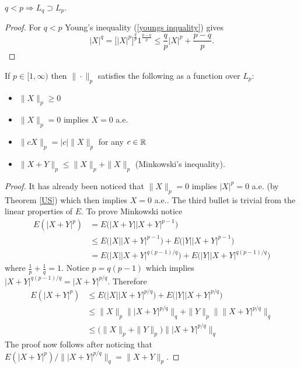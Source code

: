 \begin{theorem} $q<p \Longrightarrow L_q \supset L_p$.
\end{theorem}
\begin{proof} 
For $q<p$
Young's inequality (\ref{youngs inquality}) gives
\begin{equation}
\label{p bounds q} 
|X|^q = \bigl[|X|^p\bigr]^{\frac{q}{p}} 1^{\frac{p-q}{p}} \leq \frac{q}{p}|X|^p + \frac{p-q}{p}. 
\end{equation}
\end{proof}



\begin{theorem}
\label{pnorm is a pseudo-norm}
If $p\in [1,\infty)$ then
$\|\cdot \|_p$ satisfies the following as a function over $L_p$:
\begin{itemize}
\item $\| X \|_p \geq 0$ 
\item $\| X \|_p = 0$ implies $X = 0$ a.e.
\item $\| c X \|_p = |c| \| X \|_p$ for any $c\in \Bbb R$
\item $\| X + Y \|_p \leq \| X \|_p + \| X \|_p$ (Minkowski's inequality).
\end{itemize}
\end{theorem}
\begin{proof}
It has already been noticed that $\| X\|_p=0$ implies $|X|^p=0$ a.e. (by Theorem \ref{US}) which then implies $X=0$ a.e.. The third bullet is trivial from the linear properties of $E$. To prove Minkowski notice
\begin{align*}
E(|X+Y|^p)
& = E\bigl(|X+Y| |X+Y|^{p-1}\bigr) \\
& \leq E\bigl(|X| |X+Y|^{p-1}\bigr) + E\bigl(|Y| |X+Y|^{p-1}\bigr)\\
& = E\bigl(|X| |X+Y|^{q(p-1)/q}\bigr) + E\bigl(|Y| |X+Y|^{q(p-1)/q}\bigr)
\end{align*}
where $\frac{1}{p} + \frac{1}{q} =1$. Notice  $p = q(p-1)$ which implies $|X+Y|^{q(p-1)/q} = |X+Y|^{p/q}$. Therefore
\begin{align*}
E(|X+Y|^p)
& \leq E\bigl(|X| |X+Y|^{p/q}\bigr) + E\bigl(|Y| |X+Y|^{p/q}\bigr) \\
&\leq \|X\|_p \| |X+Y |^{p/q}\|_q + \|Y\|_p \| \|X+Y|^{p/q}\|_q \\
&\leq \bigl(\|X\|_p  + \|Y\|_p\bigr)  \| |X+Y|^{p/q}\|_q 
\end{align*}
The proof now follows after noticing that  $E(|X+Y|^p)/ \| |X+Y|^{p/q}\|_q =  \| X+Y\|_p$.
\end{proof}

